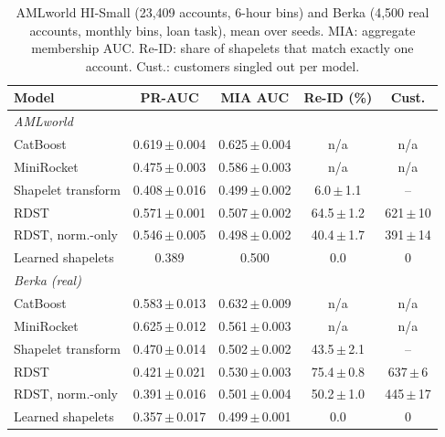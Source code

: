 \begin{table}[H]
\caption{AMLworld HI-Small (23,409 accounts, 6-hour bins) and Berka (4,500 real accounts, monthly bins, loan task), mean over seeds. MIA: aggregate membership AUC. Re-ID: share of shapelets that match exactly one account. Cust.: customers singled out per model.}
\label{tab:aml}
\small\setlength{\tabcolsep}{2.5pt}
\centering
\begin{tabular}{lcccc}
\toprule
Model & PR-AUC & MIA AUC & Re-ID (\%) & Cust. \\
\midrule
\multicolumn{5}{l}{\emph{AMLworld}} \\
CatBoost & 0.619\,$\pm$\,0.004 & 0.625\,$\pm$\,0.004 & n/a & n/a \\
MiniRocket & 0.475\,$\pm$\,0.003 & 0.586\,$\pm$\,0.003 & n/a & n/a \\
Shapelet transform & 0.408\,$\pm$\,0.016 & 0.499\,$\pm$\,0.002 & 6.0\,$\pm$\,1.1 & -- \\
RDST & 0.571\,$\pm$\,0.001 & 0.507\,$\pm$\,0.002 & 64.5\,$\pm$\,1.2 & 621\,$\pm$\,10 \\
RDST, norm.-only & 0.546\,$\pm$\,0.005 & 0.498\,$\pm$\,0.002 & 40.4\,$\pm$\,1.7 & 391\,$\pm$\,14 \\
Learned shapelets & 0.389 & 0.500 & 0.0 & 0 \\
\multicolumn{5}{l}{\emph{Berka (real)}} \\
CatBoost & 0.583\,$\pm$\,0.013 & 0.632\,$\pm$\,0.009 & n/a & n/a \\
MiniRocket & 0.625\,$\pm$\,0.012 & 0.561\,$\pm$\,0.003 & n/a & n/a \\
Shapelet transform & 0.470\,$\pm$\,0.014 & 0.502\,$\pm$\,0.002 & 43.5\,$\pm$\,2.1 & -- \\
RDST & 0.421\,$\pm$\,0.021 & 0.530\,$\pm$\,0.003 & 75.4\,$\pm$\,0.8 & 637\,$\pm$\,6 \\
RDST, norm.-only & 0.391\,$\pm$\,0.016 & 0.501\,$\pm$\,0.004 & 50.2\,$\pm$\,1.0 & 445\,$\pm$\,17 \\
Learned shapelets & 0.357\,$\pm$\,0.017 & 0.499\,$\pm$\,0.001 & 0.0 & 0 \\
\bottomrule\end{tabular}\end{table}
